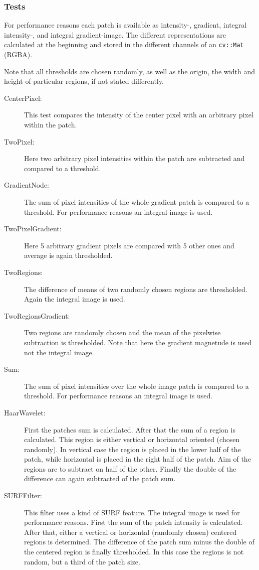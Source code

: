 \subsubsection{Tests}
For performance reasons each patch is available as intensity-, gradient, integral intensity-, and integral gradient-image. The different representations are calculated at the beginning and stored in the different channels of an \texttt{cv::Mat} (RGBA).

Note that all thresholds are chosen randomly, as well as the origin, the width and height of particular regions, if not stated differently.

\FloatBarrier
\begin{description}
\item[CenterPixel:]
This test compares the intensity of the center pixel with an arbitrary pixel within the patch.

\item[TwoPixel:]
Here two arbitrary pixel intensities within the patch are subtracted and compared to a threshold.

\item[GradientNode:]
The sum of pixel intensities of the whole gradient patch is compared to a threshold. For performance reasons an integral image is used. 

\item[TwoPixelGradient:]
Here 5 arbitrary gradient pixels are compared with 5 other ones and average is again thresholded.

\item[TwoRegions:]
The difference of means of two randomly chosen regions are thresholded. Again the integral image is used.

\item[TwoRegionsGradient:]
Two regions are randomly chosen and the mean of the pixelwise subtraction is thresholded. Note that here the gradient magnetude is used not the integral image.

\item[Sum:]
The sum of pixel intensities over the whole image patch is compared to a threshold. For performance reasons an integral image is used.

\item[HaarWavelet:]
First the patches sum is calculated. After that the sum of a region is calculated. This region is either vertical or horizontal oriented (chosen randomly). In vertical case the region is placed in the lower half of the patch, while horizontal is placed in the right half of the patch. Aim of the regions are to subtract on half of the other. Finally the double of the difference can again subtracted of the patch sum.

\item[SURFFilter:]
This filter uses a kind of SURF feature. The integral image is used for performance reasons. First the sum of the patch intensity is calculated. After that, either a vertical or horizontal (randomly chosen) centered regions is determined. The difference of the patch sum minus the double of the centered region is finally thresholded. In this case the regions is not random, but a third of the patch size.
\end{description}



